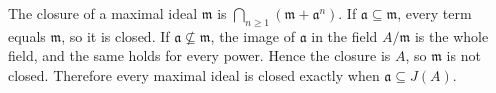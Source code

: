 The closure of a maximal ideal $\mathfrak{m}$ is $\bigcap_{n\ge1}(\mathfrak{m}+\mathfrak{a}^n)$. If $\mathfrak{a}\subseteq\mathfrak{m}$, every term equals $\mathfrak{m}$, so it is closed. If $\mathfrak{a}\not\subseteq\mathfrak{m}$, the image of $\mathfrak{a}$ in the field $A/\mathfrak{m}$ is the whole field, and the same holds for every power. Hence the closure is $A$, so $\mathfrak{m}$ is not closed. Therefore every maximal ideal is closed exactly when $\mathfrak{a}\subseteq J(A)$.
